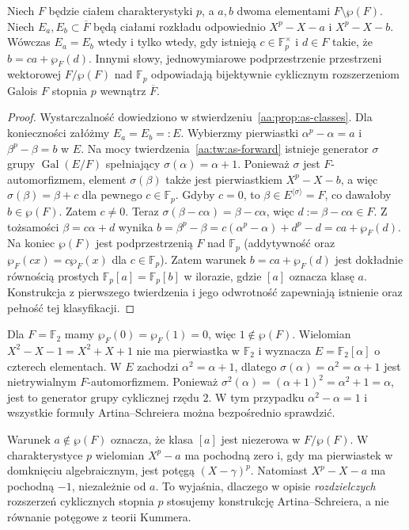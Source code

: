 \begin{twierdzenie}
\label{aa:tw:as-classification}
Niech $F$ będzie ciałem charakterystyki $p$, a $a,b$ dwoma
elementami $F\setminus\wp(F)$. Niech $E_a,E_b\subset\overline F$
będą ciałami rozkładu odpowiednio $X^p-X-a$ i $X^p-X-b$.
Wówczas $E_a=E_b$ wtedy i tylko wtedy, gdy istnieją
$c\in\mathbb F_p^\times$ i $d\in F$ takie, że
$b=ca+\wp_F(d)$. Innymi słowy, jednowymiarowe
podprzestrzenie przestrzeni wektorowej $F/\wp(F)$ nad
$\mathbb F_p$ odpowiadają bijektywnie cyklicznym
rozszerzeniom Galois $F$ stopnia $p$ wewnątrz $\overline F$.
\end{twierdzenie}
\begin{proof}
Wystarczalność dowiedziono w
stwierdzeniu~\ref{aa:prop:as-classes}. Dla konieczności
załóżmy $E_a=E_b=:E$. Wybierzmy pierwiastki
$\alpha^p-\alpha=a$ i $\beta^p-\beta=b$ w $E$.
Na mocy twierdzenia~\ref{aa:tw:as-forward} istnieje generator
$\sigma$ grupy $\operatorname{Gal}(E/F)$ spełniający
$\sigma(\alpha)=\alpha+1$. Ponieważ $\sigma$ jest
$F$-automorfizmem, element $\sigma(\beta)$ także jest
pierwiastkiem $X^p-X-b$, a więc
$\sigma(\beta)=\beta+c$ dla pewnego $c\in\mathbb F_p$.
Gdyby $c=0$, to $\beta\in E^{\langle\sigma\rangle}=F$,
co dawałoby $b\in\wp(F)$. Zatem $c\ne0$.
Teraz $\sigma(\beta-c\alpha)=\beta-c\alpha$, więc
$d:=\beta-c\alpha\in F$. Z tożsamości
$\beta=c\alpha+d$ wynika
$b=\beta^p-\beta=c(\alpha^p-\alpha)+d^p-d
=ca+\wp_F(d)$.
Na koniec $\wp(F)$ jest podprzestrzenią $F$ nad
$\mathbb F_p$ (addytywność oraz
$\wp_F(cx)=c\wp_F(x)$ dla $c\in\mathbb F_p$).
Zatem warunek $b=ca+\wp_F(d)$ jest dokładnie równością
prostych $\mathbb F_p[a]=\mathbb F_p[b]$ w ilorazie,
gdzie $[a]$ oznacza klasę $a$. Konstrukcja z pierwszego
twierdzenia i jego odwrotność zapewniają istnienie oraz
pełność tej klasyfikacji.
\end{proof}

\begin{przyklad}
\label{aa:prz:as-four-elements}
Dla $F=\mathbb F_2$ mamy $\wp_F(0)=\wp_F(1)=0$,
więc $1\notin\wp(F)$. Wielomian $X^2-X-1=X^2+X+1$
nie ma pierwiastka w $\mathbb F_2$ i wyznacza
$E=\mathbb F_2[\alpha]$ o czterech elementach.
W $E$ zachodzi $\alpha^2=\alpha+1$, dlatego
$\sigma(\alpha)=\alpha^2=\alpha+1$ jest nietrywialnym
$F$-automorfizmem. Ponieważ
$\sigma^2(\alpha)=(\alpha+1)^2=\alpha^2+1=\alpha$,
jest to generator grupy cyklicznej rzędu $2$.
W tym przypadku $\alpha^2-\alpha=1$ i wszystkie formuły
Artina--Schreiera można bezpośrednio sprawdzić.
\end{przyklad}

\begin{uwaga}\label{aa:uw:as-vs-kummer}
Warunek $a\notin\wp(F)$ oznacza, że klasa $[a]$ jest
niezerowa w $F/\wp(F)$. W charakterystyce $p$ wielomian
$X^p-a$ ma pochodną zero i, gdy ma pierwiastek w domknięciu
algebraicznym, jest potęgą $(X-\gamma)^p$.
Natomiast $X^p-X-a$ ma pochodną $-1$, niezależnie od $a$.
To wyjaśnia, dlaczego w opisie \emph{rozdzielczych}
rozszerzeń cyklicznych stopnia $p$ stosujemy konstrukcję
Artina--Schreiera, a nie równanie potęgowe z teorii Kummera.
\end{uwaga}

